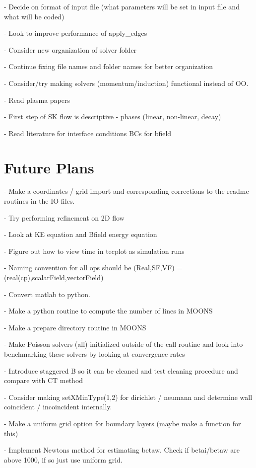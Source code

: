 \documentclass[3p,twocolumn,10pt]{elsarticle}
\begin{document}
- Decide on format of input file (what parameters will be set in input file and what will be coded)

- Look to improve performance of apply\_edges

- Consider new organization of solver folder

- Continue fixing file names and folder names for better organization

- Consider/try making solvers (momentum/induction) functional instead of OO.

- Read plasma papers

- First step of SK flow is descriptive - phases (linear, non-linear, decay)

- Read literature for interface conditions BCs for bfield

\section{Future Plans}

- Make a coordinates / grid import and corresponding corrections to the readme routines in the IO files.

- Try performing refinement on 2D flow

- Look at KE equation and Bfield energy equation

- Figure out how to view time in tecplot as simulation runs

- Naming convention for all ops should be (Real,SF,VF) = (real(cp),scalarField,vectorField)

- Convert matlab to python.

- Make a python routine to compute the number of lines in MOONS

- Make a prepare directory routine in MOONS

- Make Poisson solvers (all) initialized outside of the call routine and look into benchmarking these solvers by looking at convergence rates

- Introduce staggered B so it can be cleaned and test cleaning procedure and compare with CT method

- Consider making setXMinType(1,2) for dirichlet / neumann and determine wall coincident / incoincident internally.

- Make a uniform grid option for boundary layers (maybe make a function for this)

- Implement Newtons method for estimating betaw. Check if betai/betaw
are above 1000, if so just use uniform grid.
\end{document}

